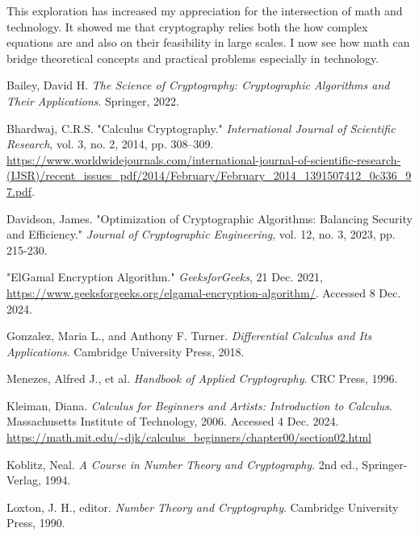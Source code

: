 \documentclass[12pt]{article}
\begin{document}
This exploration has increased my appreciation for the intersection of math and technology. It showed me that cryptography relies both the how complex equations are and also on their feasibility in large scales. I now see how math can bridge theoretical concepts and practical problems especially in technology.



\newpage

\renewcommand{\refname}{Works Cited}
\begin{thebibliography}{9}

Bailey, David H. \textit{The Science of Cryptography: Cryptographic Algorithms and Their Applications}. Springer, 2022.

Bhardwaj, C.R.S. "Calculus Cryptography." \textit{International Journal of Scientific Research}, vol. 3, no. 2, 2014, pp. 308--309. \url{https://www.worldwidejournals.com/international-journal-of-scientific-research-(IJSR)/recent_issues_pdf/2014/February/February_2014_1391507412_0c336_97.pdf}.

Davidson, James. "Optimization of Cryptographic Algorithms: Balancing Security and Efficiency." \textit{Journal of Cryptographic Engineering}, vol. 12, no. 3, 2023, pp. 215-230.

"ElGamal Encryption Algorithm." \textit{GeeksforGeeks}, 21 Dec. 2021, \url{https://www.geeksforgeeks.org/elgamal-encryption-algorithm/}. Accessed 8 Dec. 2024.

Gonzalez, Maria L., and Anthony F. Turner. \textit{Differential Calculus and Its Applications}. Cambridge University Press, 2018.

Menezes, Alfred J., et al. \textit{Handbook of Applied Cryptography}. CRC Press, 1996.

Kleiman, Diana. \textit{Calculus for Beginners and Artists: Introduction to Calculus}. Massachusetts Institute of Technology, 2006. Accessed 4 Dec. 2024. \url{https://math.mit.edu/~djk/calculus\_beginners/chapter00/section02.html}

Koblitz, Neal. \textit{A Course in Number Theory and Cryptography}. 2nd ed., Springer-Verlag, 1994.

Loxton, J. H., editor. \textit{Number Theory and Cryptography}. Cambridge University Press, 1990.


\end{thebibliography}
\end{document}
